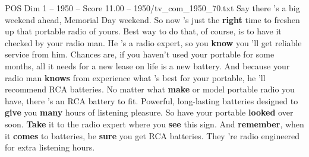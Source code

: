 \begin{textsample}{POS Dim 1 – 1950 – Score 11.00 – 1950/tv\_com\_1950\_70.txt}  \label{ex:f1_pos_005}
Say there 's a big weekend ahead, Memorial Day weekend.
So now 's just the \textbf{right} time to freshen up that portable radio of yours.
Best way to do that, of course, is to have it checked by your radio man.
He 's a radio expert, so you \textbf{know} you 'll get reliable service from him.
Chances are, if you haven't used your portable for some months, all it needs for a new lease on life is a new battery.
And because your radio man \textbf{knows} from experience what 's best for your portable, he 'll recommend RCA batteries.
No matter what \textbf{make} or model portable radio you have, there 's an RCA battery to fit.
Powerful, long-lasting batteries designed to \textbf{give} you \textbf{many} hours of listening pleasure.
So have your portable \textbf{looked} over soon. \textbf{Take} it to the radio expert where you \textbf{see} this sign.
And \textbf{remember}, when it \textbf{comes} to batteries, be \textbf{sure} you get RCA batteries.
They 're radio engineered for extra listening hours.

\end{textsample}
